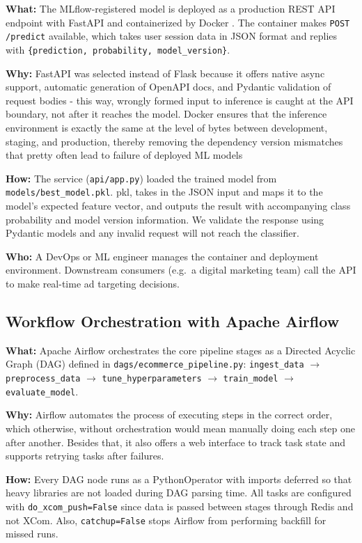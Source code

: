 \documentclass[12pt,a4paper]{article}
\begin{document}
\textbf{What:} The MLflow-registered model is deployed as a production REST API endpoint with FastAPI \cite{fastapi} and containerized by Docker \cite{docker2024}. The container makes \texttt{POST /predict} available, which takes user session data in JSON format and replies with \texttt{\{prediction, probability, model\_version\}}.

\textbf{Why:} FastAPI was selected instead of Flask because it offers native async support,
automatic generation of OpenAPI docs, and Pydantic validation of request
bodies - this way, wrongly formed input to inference is caught at the API
boundary, not after it reaches the model. Docker ensures that the inference environment is
exactly the same at the level of bytes between development, staging, and production, thereby removing
the dependency version mismatches that pretty often lead to failure of deployed ML models

\textbf{How:} The service (\texttt{api/app.py}) loaded the trained model from \texttt{models/best\_model.pkl}.
pkl, takes in the JSON input and maps it to the model's expected feature vector, and outputs the result with accompanying class probability and model version information. We validate the response using Pydantic models and any invalid request will not reach the classifier.

\textbf{Who:} A DevOps or ML engineer manages the container and deployment environment.
Downstream consumers (e.g.\ a digital marketing team) call the API to make real-time
ad targeting decisions.

\subsection{Workflow Orchestration with Apache Airflow}

\textbf{What:} Apache Airflow \cite{airflow} orchestrates the core pipeline stages as a
Directed Acyclic Graph (DAG) defined in \texttt{dags/ecommerce\_pipeline.py}:
\texttt{ingest\_data} $\rightarrow$ \texttt{preprocess\_data} $\rightarrow$ 
\texttt{tune\_hyperparameters} $\rightarrow$ \texttt{train\_model} $\rightarrow$ 
\texttt{evaluate\_model}.

\textbf{Why:} Airflow automates the process of executing steps in the correct order, which otherwise, without orchestration would mean manually doing each step one after another.
Besides that, it also offers a web interface to track task state and supports retrying tasks after failures.

\textbf{How:} Every DAG node runs as a PythonOperator with imports deferred so that heavy libraries are not loaded during DAG parsing time.
All tasks are configured with \texttt{do\_xcom\_push=False} since data is passed between stages through Redis and not XCom. Also,
\texttt{catchup=False}  stops Airflow from performing backfill for missed runs.
\end{document}
